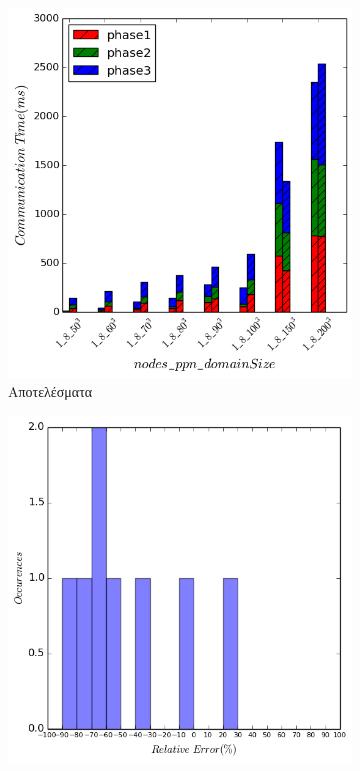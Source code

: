 \begin{figure}[ht]
    \centering
    \captionsetup{justification=centering,margin=0cm,font=footnotesize}
    \begin{subfigure}[b]{0.47\textwidth}
        \includegraphics[width=\textwidth]{./images/NB+cg_UMA/NB_cg_lulesh_res.png}
        \caption{Αποτελέσματα}
    \end{subfigure}
    \quad %
    \begin{subfigure}[b]{0.47\textwidth}
        \includegraphics[width=\textwidth]{./images/NB+cg_UMA/NB_cg_lulesh_err_dist.png}

\end{subfigure}
\end{figure}
